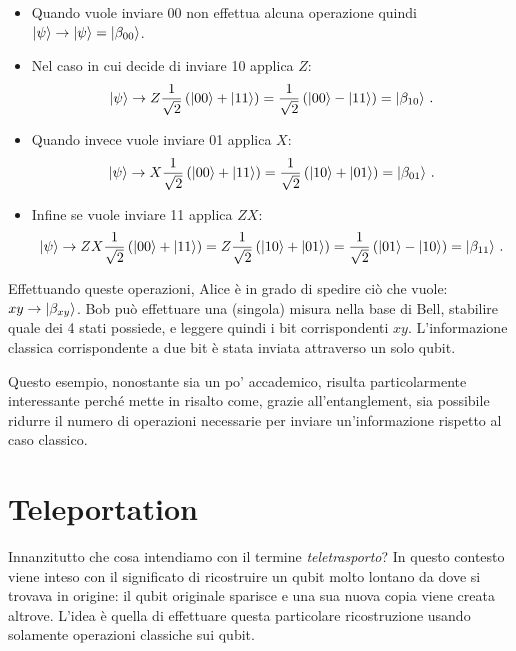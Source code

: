 \begin{itemize}
    \item Quando vuole inviare 00 non effettua alcuna operazione quindi $\ket{\psi} \rightarrow \ket{\psi} = \ket{\beta_{00}}$. 
    
    \item Nel caso in cui decide di inviare 10 applica $Z$:
    \begin{equation*}
        \ket{\psi} \rightarrow Z \frac{1}{\sqrt{2}} \left( \ket{00} + \ket{11} \right) = \frac{1}{\sqrt{2}} \left( \ket{00} - \ket{11} \right) = \ket{\beta_{10}} \, .
    \end{equation*}
    
    \item Quando invece vuole inviare 01 applica $X$:
    \begin{equation*}
        \ket{\psi} \rightarrow X \frac{1}{\sqrt{2}} \left( \ket{00} + \ket{11} \right) = \frac{1}{\sqrt{2}} \left( \ket{10} + \ket{01} \right) = \ket{\beta_{01}} \, .
    \end{equation*}
    
    \item Infine se vuole inviare 11 applica $ZX$:
    \begin{equation*}
        \ket{\psi} \rightarrow ZX \frac{1}{\sqrt{2}} \left( \ket{00} + \ket{11} \right) = Z \frac{1}{\sqrt{2}} \left( \ket{10} + \ket{01} \right) = \frac{1}{\sqrt{2}} \left( \ket{01} - \ket{10} \right) = \ket{\beta_{11}} \, .
    \end{equation*}
\end{itemize}

\noindent Effettuando queste operazioni, Alice è in grado di spedire ciò che vuole: $xy \rightarrow \ket{\beta_{xy}}$. Bob può effettuare una (singola) misura nella base di Bell, stabilire quale dei 4 stati possiede, %
e leggere quindi i bit corrispondenti $xy$. L'informazione classica corrispondente a due bit \`e stata inviata attraverso un solo qubit.

\noindent Questo esempio, nonostante sia un po' accademico, risulta particolarmente interessante perché mette in risalto come, grazie all'entanglement, sia possibile ridurre il numero di operazioni necessarie per inviare un'informazione rispetto al caso classico. 

\section{Teleportation}
Innanzitutto che cosa intendiamo con il termine \textit{teletrasporto}? In questo contesto viene inteso con il significato di ricostruire un qubit molto lontano da dove si trovava in origine: il qubit originale sparisce e una sua nuova copia viene creata altrove. L'idea è quella di effettuare questa particolare ricostruzione usando solamente operazioni classiche sui qubit.

